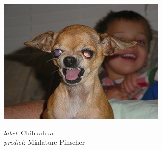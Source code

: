 \documentclass{article}
\begin{document}
\begin{figure}
\begin{subfigure}{0.32\linewidth}
		\centering
		\includegraphics[width=\linewidth]{pics/s1}
		\caption{}
		\emph{label}: Chihuahua \\ \emph{predict}: Minlature Pinscher
		\label{fig:s1}
	\end{subfigure} 
	

\end{figure}
\end{document}
